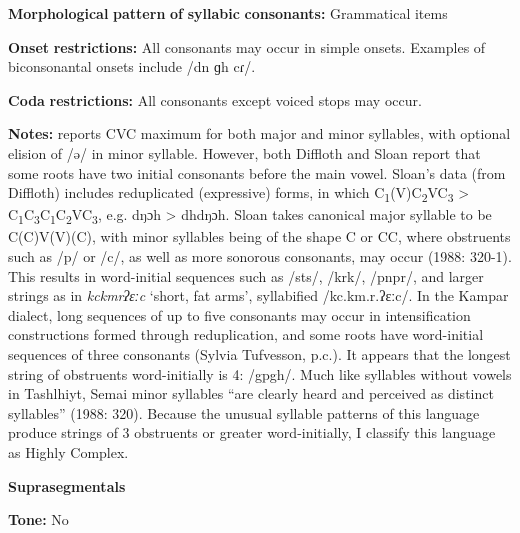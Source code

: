 \begin{styleBody}
\textbf{Morphological} \textbf{pattern} \textbf{of} \textbf{syllabic} \textbf{consonants:} Grammatical items
\end{styleBody}

\begin{styleBody}
\textbf{Onset} \textbf{restrictions:} All consonants may occur in simple onsets. Examples of biconsonantal onsets include /dn ɡh cɾ/.
\end{styleBody}

\begin{styleBody}
\textbf{Coda} \textbf{restrictions:} All consonants except voiced stops may occur.
\end{styleBody}

\begin{styleBody}
\textbf{Notes:} \citet{Philips2007} reports CVC maximum for both major and minor syllables, with optional elision of /ə/ in minor syllable. However, both Diffloth and Sloan report that some roots have two initial consonants before the main vowel. Sloan’s data (from Diffloth) includes reduplicated (expressive) forms, in which C\textsubscript{1}(V)C\textsubscript{2}VC\textsubscript{3} > C\textsubscript{1}C\textsubscript{3}C\textsubscript{1}C\textsubscript{2}VC\textsubscript{3}, e.g. dŋɔh > dhdŋɔh. Sloan takes canonical major syllable to be C(C)V(V)(C), with minor syllables being of the shape C or CC, where obstruents such as /p/ or /c/, as well as more sonorous consonants, may occur (1988: 320-1). This results in word-initial sequences such as /sts/, /krk/, /pnpr/, and larger strings as in \textit{kckmrʔɛːc} ‘short, fat arms’, syllabified /kc.km.r.ʔɛːc/. In the Kampar dialect, long sequences of up to five consonants may occur in intensification constructions formed through reduplication, and some roots have word-initial sequences of three consonants (Sylvia Tufvesson, p.c.). It appears that the longest string of obstruents word-initially is 4: /gpgh/. Much like syllables without vowels in Tashlhiyt, Semai minor syllables “are clearly heard and perceived as distinct syllables” (1988: 320). Because the unusual syllable patterns of this language produce strings of 3 obstruents or greater word-initially, I classify this language as Highly Complex.
\end{styleBody}

\begin{styleBody}
\textbf{Suprasegmentals}
\end{styleBody}

\begin{styleBody}
\textbf{Tone:} No
\end{styleBody}

